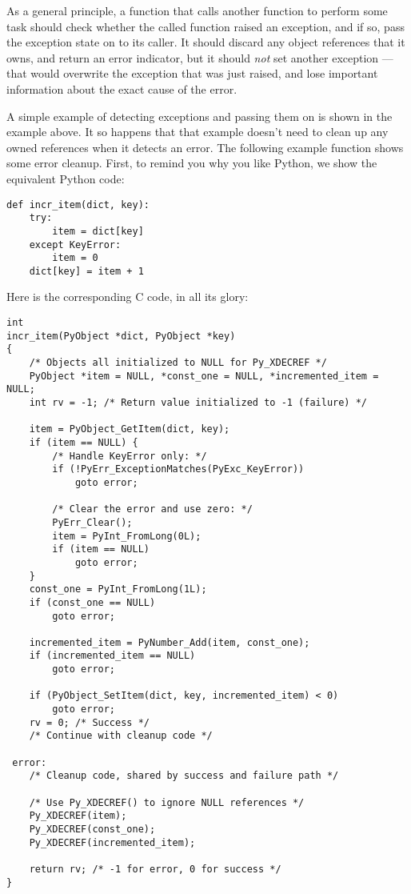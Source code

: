 As a general principle, a function that calls another function to 
perform some task should check whether the called function raised an 
exception, and if so, pass the exception state on to its caller.  It 
should discard any object references that it owns, and return an 
error indicator, but it should \emph{not} set another exception ---
that would overwrite the exception that was just raised, and lose
important information about the exact cause of the error.

A simple example of detecting exceptions and passing them on is shown
in the  example
above.  It so happens that that example doesn't need to clean up any
owned references when it detects an error.  The following example
function shows some error cleanup.  First, to remind you why you like
Python, we show the equivalent Python code:

\begin{verbatim}
def incr_item(dict, key):
    try:
        item = dict[key]
    except KeyError:
        item = 0
    dict[key] = item + 1
\end{verbatim}

Here is the corresponding C code, in all its glory:

\begin{verbatim}
int
incr_item(PyObject *dict, PyObject *key)
{
    /* Objects all initialized to NULL for Py_XDECREF */
    PyObject *item = NULL, *const_one = NULL, *incremented_item = NULL;
    int rv = -1; /* Return value initialized to -1 (failure) */

    item = PyObject_GetItem(dict, key);
    if (item == NULL) {
        /* Handle KeyError only: */
        if (!PyErr_ExceptionMatches(PyExc_KeyError))
            goto error;

        /* Clear the error and use zero: */
        PyErr_Clear();
        item = PyInt_FromLong(0L);
        if (item == NULL)
            goto error;
    }
    const_one = PyInt_FromLong(1L);
    if (const_one == NULL)
        goto error;

    incremented_item = PyNumber_Add(item, const_one);
    if (incremented_item == NULL)
        goto error;

    if (PyObject_SetItem(dict, key, incremented_item) < 0)
        goto error;
    rv = 0; /* Success */
    /* Continue with cleanup code */

 error:
    /* Cleanup code, shared by success and failure path */

    /* Use Py_XDECREF() to ignore NULL references */
    Py_XDECREF(item);
    Py_XDECREF(const_one);
    Py_XDECREF(incremented_item);

    return rv; /* -1 for error, 0 for success */
}
\end{verbatim}

